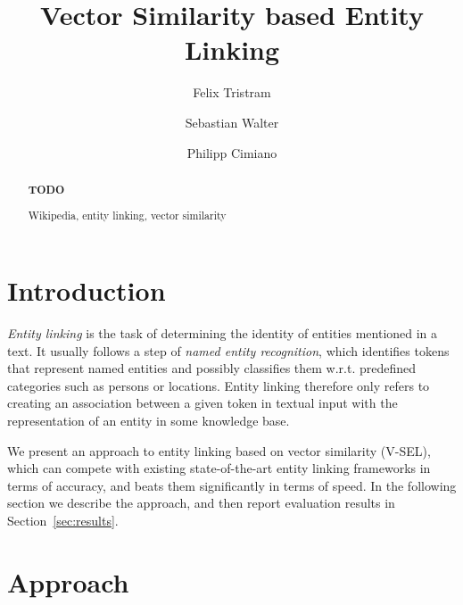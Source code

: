 \documentclass[runningheads,a4paper]{llncs}
\newcommand{\keywords}[1]{\par\addvspace\baselineskip
\noindent\keywordname\enspace\ignorespaces#1}
\begin{document}
\mainmatter  %

\newcommand{\acronym}{V-SEL}



\title{Vector Similarity based Entity Linking}

\author{Felix Tristram \and Sebastian Walter \and Philipp Cimiano}



\maketitle


\begin{abstract}
\textbf{TODO}

\keywords{Wikipedia, entity linking, vector similarity}
\end{abstract}

\section{Introduction}\label{sec:introduction}

\emph{Entity linking} is the task of determining the identity of entities mentioned in a text. It usually follows a step of \emph{named entity recognition}, which identifies tokens that represent named entities and possibly classifies them w.r.t. predefined categories such as persons or locations. Entity linking therefore only refers to creating an association between a given token in textual input with the representation of an entity in some knowledge base.

We present an approach to entity linking based on vector similarity (V-SEL), which can compete with existing state-of-the-art entity linking frameworks in terms of accuracy, and beats them significantly in terms of speed. 
In the following section we describe the approach, and then report evaluation results in Section~\ref{sec:results}.


\section{Approach}\label{sec:approach}
\end{document}
